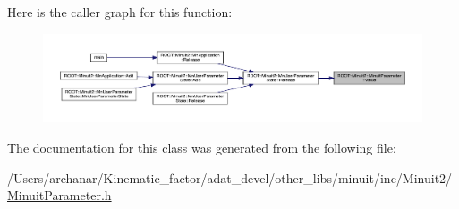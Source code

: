 Here is the caller graph for this function\+:\nopagebreak
\begin{figure}[H]
\begin{center}
\leavevmode
\includegraphics[width=350pt]{dd/dfb/classROOT_1_1Minuit2_1_1MinuitParameter_ac77aed82006ba9e9598df49a1753d31c_icgraph}
\end{center}
\end{figure}


The documentation for this class was generated from the following file\+:\begin{DoxyCompactItemize}
\item 
/\+Users/archanar/\+Kinematic\+\_\+factor/adat\+\_\+devel/other\+\_\+libs/minuit/inc/\+Minuit2/\mbox{\hyperlink{other__libs_2minuit_2inc_2Minuit2_2MinuitParameter_8h}{Minuit\+Parameter.\+h}}\end{DoxyCompactItemize}
